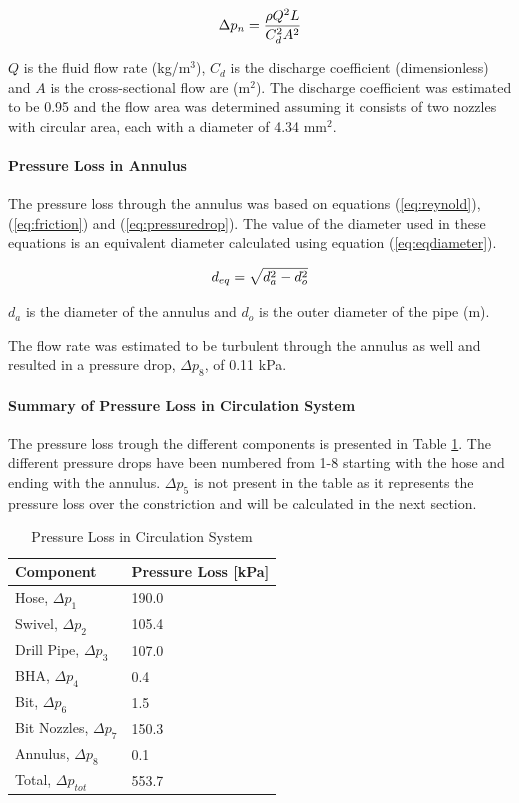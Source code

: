 \begin{equation}
\centering
   \Delta p_n = \frac{\rho Q^2 L}{C_d^2 A^2}
\label{eq:nozzle}
\end{equation}

$Q$ is the fluid flow rate (kg/m$^3$), $C_d$ is the discharge coefficient (dimensionless) and $A$ is the cross-sectional flow are (m$^2$). The discharge coefficient was estimated to be 0.95 and the flow area was determined assuming it consists of two nozzles with circular area, each with a diameter of 4.34 mm$^2$.

\paragraph{Pressure Loss in Annulus}
The pressure loss through the annulus was based on equations (\ref{eq:reynold}), (\ref{eq:friction}) and (\ref{eq:pressuredrop}). The value of the diameter used in these equations is an equivalent diameter calculated using equation (\ref{eq:eqdiameter}).

\begin{equation}
\centering
   d_{eq} = \sqrt{d_a^2-d_o^2}
\label{eq:eqdiameter}
\end{equation}

$d_a$ is the diameter of the annulus and $d_o$ is the outer diameter of the pipe (m).

The flow rate was estimated to be turbulent through the annulus as well and resulted in a pressure drop, $\Delta p_8$, of 0.11 kPa.

\paragraph{Summary of Pressure Loss in Circulation System}
The pressure loss trough the different components is presented in Table \ref{tab:sumpressure}. The different pressure drops have been numbered from 1-8 starting with the hose and ending with the annulus. $\Delta p_5$ is not present in the table as it represents the pressure loss over the constriction and will be calculated in the next section.

\begin{table} [H]
    \centering
    \caption{Pressure Loss in Circulation System}
    \begin{tabular}{p{3cm} p{4cm}}
        Component & Pressure Loss [kPa] \\ \hline \hline
        Hose, $\Delta p_1$  & 190.0 \\ \hline
        Swivel, $\Delta p_2$ & 105.4 \\ \hline
        Drill Pipe, $\Delta p_3$ & 107.0 \\ \hline
        BHA, $\Delta p_4$ & 0.4 \\ \hline
        Bit, $\Delta p_6$ & 1.5 \\ \hline
        Bit Nozzles, $\Delta p_7$ & 150.3 \\ \hline
        Annulus, $\Delta p_8$ & 0.1 \\ \hline
        Total, $\Delta p_{tot}$ & 553.7 \\
    \end{tabular}
    \label{tab:sumpressure}
\end{table}

